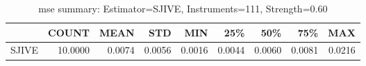 \begin{table}[ht]
\centering
\caption{mse summary: Estimator=SJIVE, Instruments=111, Strength=0.60}
\begin{tabular}{lrrrrrrrr}
\toprule
 & COUNT & MEAN & STD & MIN & 25\% & 50\% & 75\% & MAX \\
\midrule
SJIVE & 10.0000 & 0.0074 & 0.0056 & 0.0016 & 0.0044 & 0.0060 & 0.0081 & 0.0216 \\
\bottomrule
\end{tabular}
\end{table}
